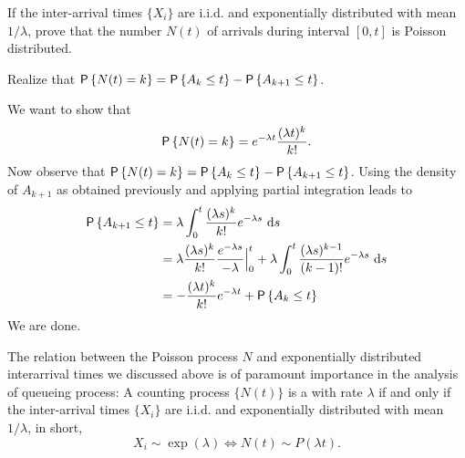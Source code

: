 \begin{exercise}
  If the inter-arrival times $\{X_i\}$ are i.i.d. and exponentially
  distributed with mean $1/\lambda$, prove that the number $N(t)$ of
  arrivals during interval $[0,t]$ is Poisson distributed.
  \begin{hint}
  Realize that
    $\P{N(t)=k} = \P{A_k \leq t} - \P{A_{k+1} \leq t}$.
  \end{hint}
    \begin{solution}
      We want to show that
    \begin{equation*}
      \P{N(t)=k} = e^{-\lambda t}\frac{(\lambda t)^k}{k!}.
    \end{equation*}
    Now observe that
    $\P{N(t)=k} = \P{A_k \leq t} - \P{A_{k+1} \leq t}$.  Using the
    density of $A_{k+1}$ as obtained previously and applying partial
    integration leads to
\begin{equation*}
  \begin{split}
\P{A_{k+1} \leq t} 
&= \lambda \int_0^t \frac{(\lambda s)^{k}}{k!}e^{-\lambda s}\, \d s \\
&= \lambda \frac{(\lambda s)^{k}}{k!}\frac{e^{-\lambda s}}{-\lambda} \Big|_{0}^t + \lambda \int_0^t \frac{(\lambda s)^{k-1}}{(k-1)!}e^{-\lambda s}\, \d s \\
&= - \frac{(\lambda t)^{k}}{k!} e^{-\lambda t} + \P{A_k \leq t}
  \end{split}
\end{equation*}
We are done.
    \end{solution}
\end{exercise}


The relation between the Poisson process $N$ and exponentially distributed interarrival times we discussed above is  of paramount importance in the analysis of queueing process: A counting process $\{N(t)\}$ is a  with rate $\lambda$ if and only if  the inter-arrival times $\{X_i\}$ are i.i.d. and exponentially distributed with mean $1/\lambda$,  in short, 
\begin{equation*}
X_i\sim \exp(\lambda) \Leftrightarrow N(t) \sim P(\lambda t).
\end{equation*}






